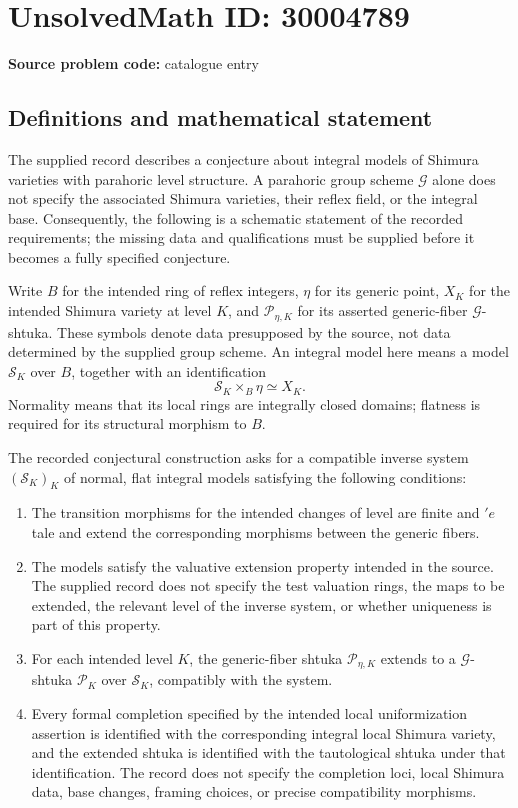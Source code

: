\documentclass[11pt]{article}
\begin{document}
\section*{UnsolvedMath ID: 30004789}
\textbf{Source problem code:} catalogue entry
\subsection{Definitions and mathematical statement}
The supplied record describes a conjecture about integral models of Shimura varieties with parahoric level structure. A parahoric group scheme \(\mathcal G\) alone does not specify the associated Shimura varieties, their reflex field, or the integral base. Consequently, the following is a schematic statement of the recorded requirements; the missing data and qualifications must be supplied before it becomes a fully specified conjecture.

Write \(B\) for the intended ring of reflex integers, \(\eta\) for its generic point, \(X_K\) for the intended Shimura variety at level \(K\), and \(\mathcal P_{\eta,K}\) for its asserted generic-fiber \(\mathcal G\)-shtuka. These symbols denote data presupposed by the source, not data determined by the supplied group scheme. An integral model here means a model \(\mathcal S_K\) over \(B\), together with an identification
\[
\mathcal S_K\times_B\eta\simeq X_K.
\]
Normality means that its local rings are integrally closed domains; flatness is required for its structural morphism to \(B\).

The recorded conjectural construction asks for a compatible inverse system \((\mathcal S_K)_K\) of normal, flat integral models satisfying the following conditions:
\begin{enumerate}
\item The transition morphisms for the intended changes of level are finite and \('{e}\)tale and extend the corresponding morphisms between the generic fibers.
\item The models satisfy the valuative extension property intended in the source. The supplied record does not specify the test valuation rings, the maps to be extended, the relevant level of the inverse system, or whether uniqueness is part of this property.
\item For each intended level \(K\), the generic-fiber shtuka \(\mathcal P_{\eta,K}\) extends to a \(\mathcal G\)-shtuka \(\mathcal P_K\) over \(\mathcal S_K\), compatibly with the system.
\item Every formal completion specified by the intended local uniformization assertion is identified with the corresponding integral local Shimura variety, and the extended shtuka is identified with the tautological shtuka under that identification. The record does not specify the completion loci, local Shimura data, base changes, framing choices, or precise compatibility morphisms.
\end{enumerate}
\end{document}
